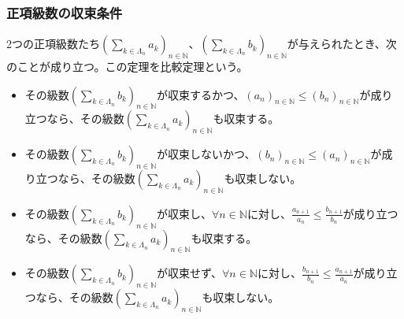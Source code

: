 \documentclass[dvipdfmx]{jsarticle}
\begin{document}
\subsubsection{正項級数の収束条件}%
\begin{thm}[比較定理]\label{4.1.8.8}
2つの正項級数たち$\left( \sum_{k \in \varLambda_{n}} a_{k} \right)_{n \in \mathbb{N}}$、$\left( \sum_{k \in \varLambda_{n}} b_{k} \right)_{n \in \mathbb{N}}$が与えられたとき、次のことが成り立つ。この定理を比較定理という。
\begin{itemize}
\item
  その級数$\left( \sum_{k \in \varLambda_{n}} b_{k} \right)_{n \in \mathbb{N}}$が収束するかつ、$\left( a_{n} \right)_{n \in \mathbb{N}} \leq \left( b_{n} \right)_{n \in \mathbb{N}}$が成り立つなら、その級数$\left( \sum_{k \in \varLambda_{n}} a_{k} \right)_{n \in \mathbb{N}}$も収束する。
\item
  その級数$\left( \sum_{k \in \varLambda_{n}} b_{k} \right)_{n \in \mathbb{N}}$が収束しないかつ、$\left( b_{n} \right)_{n \in \mathbb{N}} \leq \left( a_{n} \right)_{n \in \mathbb{N}}$が成り立つなら、その級数$\left( \sum_{k \in \varLambda_{n}} a_{k} \right)_{n \in \mathbb{N}}$も収束しない。
\item
  その級数$\left( \sum_{k \in \varLambda_{n}} b_{k} \right)_{n \in \mathbb{N}}$が収束し、$\forall n \in \mathbb{N}$に対し、$\frac{a_{n + 1}}{a_{n}} \leq \frac{b_{n + 1}}{b_{n}}$が成り立つなら、その級数$\left( \sum_{k \in \varLambda_{n}} a_{k} \right)_{n \in \mathbb{N}}$も収束する。
\item
  その級数$\left( \sum_{k \in \varLambda_{n}} b_{k} \right)_{n \in \mathbb{N}}$が収束せず、$\forall n \in \mathbb{N}$に対し、$\frac{b_{n + 1}}{b_{n}} \leq \frac{a_{n + 1}}{a_{n}}$が成り立つなら、その級数$\left( \sum_{k \in \varLambda_{n}} a_{k} \right)_{n \in \mathbb{N}}$も収束しない。
\end{itemize}
\end{thm}
\end{document}
